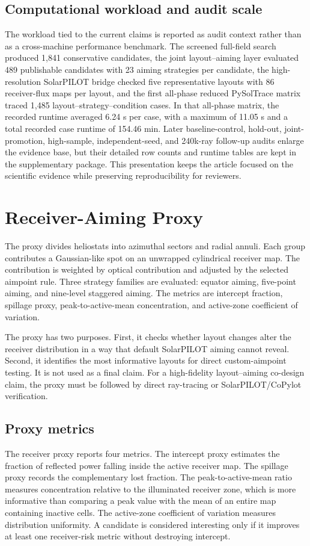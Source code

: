 \documentclass[final,3p,times]{elsarticle}
\begin{document}
\subsection{Computational workload and audit scale}
The workload tied to the current claims is reported as audit context rather than as a cross-machine performance benchmark. The screened full-field search produced 1,841 conservative candidates, the joint layout--aiming layer evaluated 489 publishable candidates with 23 aiming strategies per candidate, the high-resolution SolarPILOT bridge checked five representative layouts with 86 receiver-flux maps per layout, and the first all-phase reduced PySolTrace matrix traced 1,485 layout--strategy--condition cases. In that all-phase matrix, the recorded runtime averaged 6.24 s per case, with a maximum of 11.05 s and a total recorded case runtime of 154.46 min. Later baseline-control, hold-out, joint-promotion, high-sample, independent-seed, and 240k-ray follow-up audits enlarge the evidence base, but their detailed row counts and runtime tables are kept in the supplementary package. This presentation keeps the article focused on the scientific evidence while preserving reproducibility for reviewers.

\section{Receiver-Aiming Proxy}
The proxy divides heliostats into azimuthal sectors and radial annuli. Each group contributes a Gaussian-like spot on an unwrapped cylindrical receiver map. The contribution is weighted by optical contribution and adjusted by the selected aimpoint rule. Three strategy families are evaluated: equator aiming, five-point aiming, and nine-level staggered aiming. The metrics are intercept fraction, spillage proxy, peak-to-active-mean concentration, and active-zone coefficient of variation.

The proxy has two purposes. First, it checks whether layout changes alter the receiver distribution in a way that default SolarPILOT aiming cannot reveal. Second, it identifies the most informative layouts for direct custom-aimpoint testing. It is not used as a final claim. For a high-fidelity layout--aiming co-design claim, the proxy must be followed by direct ray-tracing or SolarPILOT/CoPylot verification.

\subsection{Proxy metrics}
The receiver proxy reports four metrics. The intercept proxy estimates the fraction of reflected power falling inside the active receiver map. The spillage proxy records the complementary lost fraction. The peak-to-active-mean ratio measures concentration relative to the illuminated receiver zone, which is more informative than comparing a peak value with the mean of an entire map containing inactive cells. The active-zone coefficient of variation measures distribution uniformity. A candidate is considered interesting only if it improves at least one receiver-risk metric without destroying intercept.
\end{document}
